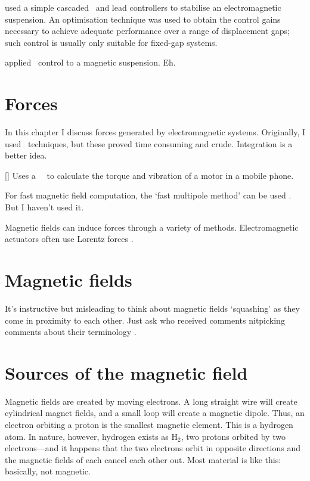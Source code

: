 \textcite{banerjee2008} used a simple cascaded \PI\ and
lead controllers to stabilise an electromagnetic
suspension. An optimisation technique was used to obtain the
control gains necessary to achieve adequate performance over a
range of displacement gaps; such control is usually only
suitable for fixed-gap systems.

\textcite{gosiewski2008} applied \Hinf\ control to a magnetic suspension. Eh.


\section{Forces}

In this chapter I discuss forces generated by electromagnetic
systems. Originally, I used \FEA\ techniques, but these proved time
consuming and crude. Integration is a better idea.

[\textcite{won2005}] Uses a \twoD\ \FEM\ to calculate the torque and
vibration of a motor in a mobile phone.

For fast magnetic field computation, the `fast multipole method' can
be used \cite{adedoyin2007}. But I haven't used it.

Magnetic fields can induce forces through a variety of
methods. Electromagnetic actuators often use Lorentz forces
\cite{hollis1993}.

\section{Magnetic fields}

It's instructive but misleading to think about magnetic fields
`squashing' as they come in proximity to each other. Just ask
\textcite{sodano2006} who received comments nitpicking comments about
their terminology \cite{marneffe2007}.

\section{Sources of the magnetic field}

Magnetic fields are created by moving electrons. A long straight wire
will create cylindrical magnet fields, and a small loop will create a
magnetic dipole. Thus, an electron orbiting a proton is the smallest
magnetic element.  This is a hydrogen atom. In nature, however,
hydrogen exists as H$_2$, two protons orbited by two electrons---and
it happens that the two electrons orbit in opposite directions and the
magnetic fields of each cancel each other out.  Most material is like
this: basically, not magnetic.

